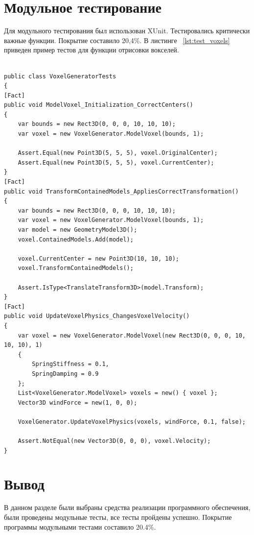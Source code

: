 \section{Модульное тестирование}

Для модульного тестирования был использован XUnit. Тестировались критически важные функции. Покрытие составило 20,4\%. В листинге ~\ref{lst:test_voxels} приведен пример тестов для функции отрисовки вокселей.
\newpage
\begin{lstlisting}[style=C, caption={Тест для функций отрисовки вокселей},label={lst:test_voxels}]

public class VoxelGeneratorTests
{
[Fact]
public void ModelVoxel_Initialization_CorrectCenters()
{
	var bounds = new Rect3D(0, 0, 0, 10, 10, 10);
	var voxel = new VoxelGenerator.ModelVoxel(bounds, 1);
	
	Assert.Equal(new Point3D(5, 5, 5), voxel.OriginalCenter);
	Assert.Equal(new Point3D(5, 5, 5), voxel.CurrentCenter);
}
[Fact]
public void TransformContainedModels_AppliesCorrectTransformation()
{
	var bounds = new Rect3D(0, 0, 0, 10, 10, 10);
	var voxel = new VoxelGenerator.ModelVoxel(bounds, 1);
	var model = new GeometryModel3D();
	voxel.ContainedModels.Add(model);
	
	voxel.CurrentCenter = new Point3D(10, 10, 10);
	voxel.TransformContainedModels();
	
	Assert.IsType<TranslateTransform3D>(model.Transform);
}
[Fact]
public void UpdateVoxelPhysics_ChangesVoxelVelocity()
{
	var voxel = new VoxelGenerator.ModelVoxel(new Rect3D(0, 0, 0, 10, 10, 10), 1)
	{
		SpringStiffness = 0.1,
		SpringDamping = 0.9
	};
	List<VoxelGenerator.ModelVoxel> voxels = new() { voxel };
	Vector3D windForce = new(1, 0, 0);
	
	VoxelGenerator.UpdateVoxelPhysics(voxels, windForce, 0.1, false);
	
	Assert.NotEqual(new Vector3D(0, 0, 0), voxel.Velocity);
}

\end{lstlisting}

\section*{Вывод}
В данном разделе были выбраны средства реализации программного обеспечения, были проведены модульные тесты, все тесты пройдены успешно. Покрытие программы модульными тестами составило 20.4\%.
